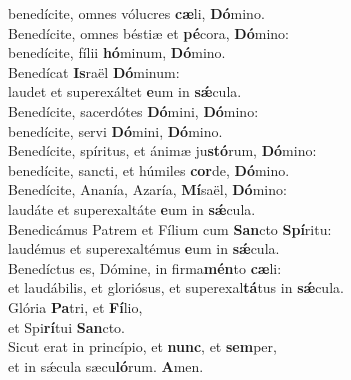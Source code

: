 \oddverse benedícite, omnes vólucres \textbf{cæ}li, \textbf{Dó}mino.\\
\evenverse Benedícite, omnes béstiæ et \textbf{pé}cora, \textbf{Dó}mino:~\*\\
\evenverse benedícite, fílii \textbf{hó}minum, \textbf{Dó}mino.\\
\oddverse Benedícat \textbf{Is}raël \textbf{Dó}minum:~\*\\
\oddverse laudet et superexáltet \textbf{e}um in \textbf{sǽ}cula.\\
\evenverse Benedícite, sacerdótes \textbf{Dó}mini, \textbf{Dó}mino:~\*\\
\evenverse benedícite, servi \textbf{Dó}mini, \textbf{Dó}mino.\\
\oddverse Benedícite, spíritus, et ánimæ ju\textbf{stó}rum, \textbf{Dó}mino:~\*\\
\oddverse benedícite, sancti, et húmiles \textbf{cor}de, \textbf{Dó}mino.\\
\evenverse Benedícite, Ananía, Azaría, \textbf{Mí}saël, \textbf{Dó}mino:~\*\\
\evenverse laudáte et superexaltáte \textbf{e}um in \textbf{sǽ}cula.\\
\oddverse Benedicámus Patrem et Fílium cum \textbf{San}cto \textbf{Spí}ritu:~\*\\
\oddverse laudémus et superexaltémus \textbf{e}um in \textbf{sǽ}cula.\\
\evenverse Benedíctus es, Dómine, in firma\textbf{mén}to \textbf{cæ}li:~\*\\
\evenverse et laudábilis, et gloriósus, et superexal\textbf{tá}tus in \textbf{sǽ}cula.\\
\oddverse Glória \textbf{Pa}tri, et \textbf{Fí}lio,~\*\\
\oddverse et Spi\textbf{rí}tui \textbf{San}cto.\\
\evenverse Sicut erat in princípio, et \textbf{nunc}, et \textbf{sem}per,~\*\\
\evenverse et in sǽcula sæcu\textbf{ló}rum. \textbf{A}men.\\
